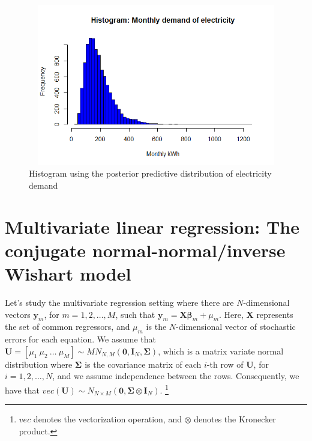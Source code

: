 \begin{figure}[!h]
	\includegraphics[width=340pt, height=200pt]{Chapters/chapter4/figures/PredDemElect.png}
	\caption[List of figure caption goes here]{Histogram using the posterior predictive distribution of electricity demand}\label{fig41}
\end{figure}

 
\section{Multivariate linear regression: The conjugate normal-normal/inverse Wishart model}\label{sec44}

Let's study the multivariate regression setting where there are $N$-dimensional vectors ${\bm{y}}_m$, for $m = 1, 2, \dots, M$, such that ${\bm{y}}_m = {\bm{X}} \bm{\beta}_m + \mu_m$. Here, ${\bm{X}}$ represents the set of common regressors, and $\mu_m$ is the $N$-dimensional vector of stochastic errors for each equation. We assume that ${\bm{U}} = [\mu_1 \ \mu_2 \ \dots \ \mu_M] \sim MN_{N,M}({\bm{0}}, {\bm{I}}_N, {\bm{\Sigma}})$, which is a matrix variate normal distribution where $\bm{\Sigma}$ is the covariance matrix of each $i$-th row of ${\bm{U}}$, for $i = 1, 2, \dots, N$, and we assume independence between the rows. Consequently, we have that $vec({\bm{U}}) \sim N_{N \times M}({\bm{0}}, \bm{\Sigma} \otimes {\bm{I}}_N)$. \footnote{$vec$ denotes the vectorization operation, and $\otimes$ denotes the Kronecker product.}

